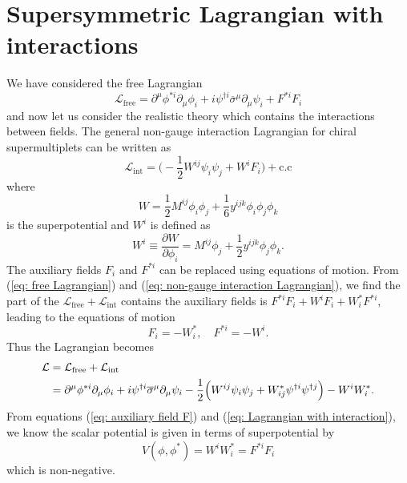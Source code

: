 \documentclass[12pt]{report}
\begin{document}
\section{Supersymmetric Lagrangian with interactions}
We have considered the free Lagrangian
\begin{equation} \label{eq: free Lagrangian}
\mathcal{L}_{\mathrm{free}} = \partial^{\mu} \phi^{*i} \partial_{\mu} \phi_{i} + i \psi^{\dag i} \overline{\sigma}^{\mu} \partial_{\mu} \psi_{i} + F^{*i} F_{i}
\end{equation}
and now let us consider the realistic theory which contains the interactions between fields.
The general non-gauge interaction Lagrangian for chiral supermultiplets can be written as
\begin{equation} \label{eq: non-gauge interaction Lagrangian}
\mathcal{L}_{\mathrm{int}} = \Big( - \frac{1}{2} W^{ij} \psi_{i} \psi_{j} + W^{i} F_{i}\Big) + \mathrm{c.c}
\end{equation}
where
\begin{equation}
W = \frac{1}{2} M^{ij} \phi_{i} \phi_{j} + \frac{1}{6} y^{ijk} \phi_{i} \phi_{j} \phi_{k}
\end{equation}
is the superpotential and $W^{i}$ is defined as 
\begin{equation}
W^{i} \equiv \frac{\partial W}{\partial \phi_{i}} = M^{ij} \phi_{j} + \frac{1}{2} y^{ijk} \phi_{j} \phi_{k}.
\end{equation}
The auxiliary fields $F_{i}$ and $F^{*i}$ can be replaced using equations of motion.
From (\ref{eq: free Lagrangian}) and (\ref{eq: non-gauge interaction Lagrangian}), we find the part of the $\mathcal{L}_{\mathrm{free}} + \mathcal{L}_{\mathrm{int}}$ contains the auxiliary fields is $F^{*i} F_{i} + W^{i} F_{i} + W^{*}_{i} F^{*i}$, leading to the equations of motion
\begin{equation} \label{eq: auxiliary field F}
F_{i} = - W^{*}_{i}, \quad 
F^{*i} = - W^{i} .
\end{equation}
Thus the Lagrangian becomes
\begin{align} \label{eq: Lagrangian with interaction}
\mathcal{L} &= \mathcal{L}_{\mathrm{free}} + \mathcal{L}_{\mathrm{int}} \notag \\
&= \partial^{\mu} \phi^{*i} \partial_{\mu} \phi_{i} + i \psi^{\dag i} \overline{\sigma}^{\mu} \partial_{\mu} \psi_{i} -\frac{1}{2} \Big( W^{ij} \psi_{i} \psi_{j} + W^{*}_{ij} \psi^{\dag i} \psi^{\dag j} \Big) - W^{i} W^{*}_{i} .
\end{align}
From equations (\ref{eq: auxiliary field F}) and (\ref{eq: Lagrangian with interaction}), we know the scalar potential is given in terms of superpotential by
\begin{equation}
V(\phi, \phi^{*}) = W^{i}W^{*}_{i} = F^{*i} F_{i}
\end{equation}
which is non-negative.
\end{document}
